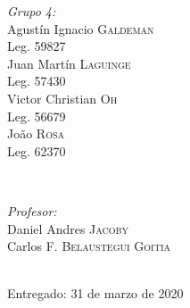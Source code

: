 \begin{titlepage}
    \begin{minipage}{0.4\textwidth}
    \begin{flushleft} \large
    \emph{Grupo 4:}\\		%
    [.3cm]
   Agust\'in Ignacio \textsc{Galdeman}\\
    Leg. 59827\\ 
    [.3cm]
    Juan Mart\'in \textsc{Laguinge}\\
    Leg. 57430\\ 
    [.3cm]
    Victor Christian \textsc{Oh}\\
    Leg. 56679\\ 
    [.3cm]
    Jo\~ao \textsc{Rosa}\\
    Leg. 62370 \\ 
    [.3cm]
    \end{flushleft}
    \end{minipage}
    ~
    \begin{minipage}{0.4\textwidth}
    \begin{flushright} \large
    \emph{Profesor:} \\
    [.3cm]
    Daniel Andres  \textsc{Jacoby}\\ %
    [.3cm]
    Carlos F. \textsc{Belaustegui Goitia}\\
    \end{flushright}
    \end{minipage}\\[2cm]
        
        
        
    \vfill
    {\large Entregado: 31 de marzo de 2020}\\[2cm] %
        
        
         
        
        
    \end{titlepage}